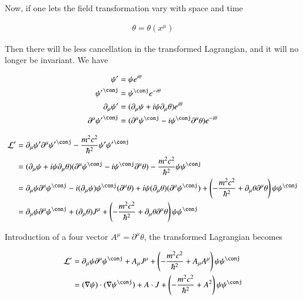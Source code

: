 Now, if one lets the field transformation vary with space and time

\begin{align}
\theta = \theta(x^\mu)
\end{align}

Then there will be less cancellation in the transformed Lagrangian, and it will no longer be invariant.  We have

\begin{align*}
\psi' &= \psi e^{i\theta} \\
{\psi'}^\conj &= \psi^\conj e^{-i\theta} \\
\partial_\mu \psi' &= (\partial_\mu \psi + i \psi \partial_\mu \theta ) e^{i\theta}  \\
\partial^\mu {\psi'}^\conj &= (\partial^\mu \psi^\conj - i \psi^\conj \partial^\mu \theta) e^{-i\theta} \\
\end{align*}

\begin{align*}
\LL'
&= \partial_\mu \psi' \partial^\mu {\psi'}^\conj - \frac{m^2 c^2}{\hbar^2} \psi' {\psi'}^\conj \\
&=
(\partial_\mu \psi + i \psi \partial_\mu \theta ) (\partial^\mu \psi^\conj - i \psi^\conj \partial^\mu \theta)
- \frac{m^2 c^2}{\hbar^2} \psi {\psi}^\conj \\
&=
\partial_\mu \psi \partial^\mu \psi^\conj
-i (\partial_\mu \psi) \psi^\conj (\partial^\mu \theta)
+ i \psi (\partial_\mu \theta) (\partial^\mu \psi^\conj)
+ \left( -\frac{m^2 c^2}{\hbar^2} + \partial_\mu \theta \partial^\mu \theta \right) \psi {\psi}^\conj \\
&=
\partial_\mu \psi \partial^\mu \psi^\conj
+ (\partial_\mu \theta) J^\mu %
+ \left( -\frac{m^2 c^2}{\hbar^2} + \partial_\mu \theta \partial^\mu \theta \right) \psi {\psi}^\conj \\
\end{align*}

Introduction of a four vector $A^\mu = \partial^\mu \theta$, the transformed Lagrangian becomes

\begin{align}
\LL'
&=
\partial_\mu \psi \partial^\mu \psi^\conj
+ A_\mu J^\mu
+ \left( -\frac{m^2 c^2}{\hbar^2} + A_\mu A^\mu \right) \psi {\psi}^\conj \\
&=
(\grad \psi) \cdot (\grad \psi^\conj) + A \cdot J
+ \left( -\frac{m^2 c^2}{\hbar^2} + A^2 \right) \psi {\psi}^\conj
\end{align}

